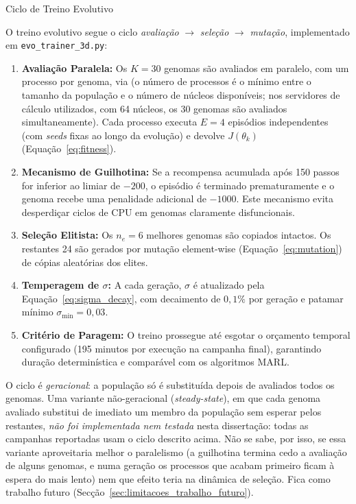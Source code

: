 \documentclass[12pt,reqno, twoside]{amsbook}
\makeatletter
\def\subsection{\@startsection{subsection}{2}%
      \z@{.5\linespacing\@plus.7\linespacing}{.25\linespacing}%
      {\normalfont\bfseries\flushleft}}
\theoremstyle{plain}
\numberwithin{equation}{chapter}
\numberwithin{section}{chapter}
\numberwithin{table}{chapter}
\numberwithin{figure}{chapter}
\makeatother
\begin{document}
\subsection{Ciclo de Treino Evolutivo}
\label{sec:evo_ciclo}

O treino evolutivo segue o ciclo \textit{avaliação} $\to$ \textit{seleção} $\to$ \textit{mutação}, implementado em \texttt{evo\_trainer\_3d.py}:
\begin{enumerate}
    \item \textbf{Avaliação Paralela:} Os $K=30$ genomas são avaliados em paralelo, com um processo por genoma, via  (o número de processos é o mínimo entre o tamanho da população e o número de núcleos disponíveis; nos servidores de cálculo utilizados, com 64 núcleos, os 30 genomas são avaliados simultaneamente). Cada processo executa $E=4$ episódios independentes (com \textit{seeds} fixas ao longo da evolução) e devolve $J(\theta_k)$ (Equação~\ref{eq:fitness}).
    \item \textbf{Mecanismo de Guilhotina:} Se a recompensa acumulada após 150 passos for inferior ao limiar de $-200$, o episódio é terminado prematuramente e o genoma recebe uma penalidade adicional de $-1000$. Este mecanismo evita desperdiçar ciclos de CPU em genomas claramente disfuncionais.
    \item \textbf{Seleção Elitista:} Os $n_e=6$ melhores genomas são copiados intactos. Os restantes 24 são gerados por mutação element-wise (Equação~\ref{eq:mutation}) de cópias aleatórias dos elites.
    \item \textbf{Temperagem de $\sigma$:} A cada geração, $\sigma$ é atualizado pela Equação~\ref{eq:sigma_decay}, com decaimento de $0{,}1\%$ por geração e patamar mínimo $\sigma_{\min}=0{,}03$.
    \item \textbf{Critério de Paragem:} O treino prossegue até esgotar o orçamento temporal configurado (195 minutos por execução na campanha final), garantindo duração determinística e comparável com os algoritmos MARL.
\end{enumerate}

O ciclo é \emph{geracional}: a população só é substituída depois de avaliados todos os genomas. Uma variante não-geracional (\textit{steady-state}), em que cada genoma avaliado substitui de imediato um membro da população sem esperar pelos restantes, \emph{não foi implementada nem testada} nesta dissertação: todas as campanhas reportadas usam o ciclo descrito acima. Não se sabe, por isso, se essa variante aproveitaria melhor o paralelismo (a guilhotina termina cedo a avaliação de alguns genomas, e numa geração os processos que acabam primeiro ficam à espera do mais lento) nem que efeito teria na dinâmica de seleção. Fica como trabalho futuro (Secção~\ref{sec:limitacoes_trabalho_futuro}).
\end{document}
